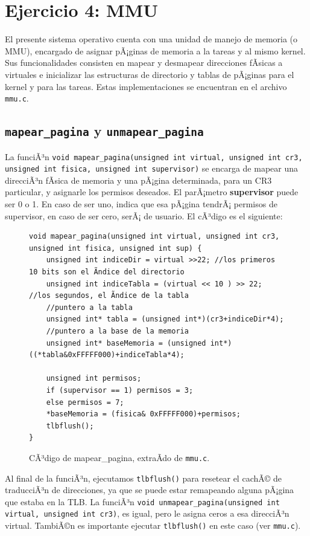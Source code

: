\documentclass[10pt, a4paper]{article}
\begin{document}
\section{Ejercicio 4: MMU}

El presente sistema operativo cuenta con una unidad de manejo de memoria (o MMU), encargado de asignar pÃ¡ginas de memoria a la tareas y al mismo kernel.
Sus funcionalidades consisten en mapear y desmapear direcciones fÃ­sicas a virtuales e inicializar las estructuras de directorio y tablas de pÃ¡ginas 
para el kernel y para las tareas.
Estas implementaciones se encuentran en el archivo \texttt{mmu.c}.
\subsection{\texttt{mapear\_pagina} y \texttt{unmapear\_pagina}}
La funciÃ³n \texttt{void mapear\_pagina(unsigned int virtual, unsigned int cr3, unsigned int fisica, unsigned int supervisor)} se encarga de mapear una direcciÃ³n fÃ­sica
de memoria y una pÃ¡gina determinada, para un CR3 particular, y asignarle los permisos deseados. 
El parÃ¡metro \textbf{supervisor} puede ser 0 o 1. En caso de ser uno, indica que esa pÃ¡gina tendrÃ¡ permisos de supervisor, en caso de ser cero, serÃ¡ de usuario.
El cÃ³digo es el siguiente:
\begin{figure}[!h]
\begin{center}
\begin{verbatim}
void mapear_pagina(unsigned int virtual, unsigned int cr3, unsigned int fisica, unsigned int sup) {
	unsigned int indiceDir = virtual >>22; //los primeros 10 bits son el Ã­ndice del directorio
	unsigned int indiceTabla = (virtual << 10 ) >> 22; //los segundos, el Ã­ndice de la tabla
	//puntero a la tabla
	unsigned int* tabla = (unsigned int*)(cr3+indiceDir*4);
	//puntero a la base de la memoria
	unsigned int* baseMemoria = (unsigned int*)((*tabla&0xFFFFF000)+indiceTabla*4);

	unsigned int permisos;
	if (supervisor == 1) permisos = 3;
	else permisos = 7; 
	*baseMemoria = (fisica& 0xFFFFF000)+permisos; 
	tlbflush();
}
\end{verbatim}
\caption{CÃ³digo de mapear\_pagina, extraÃ­do de \texttt{mmu.c}.}
\end{center}
\end{figure}
\newline
Al final de la funciÃ³n, ejecutamos \texttt{tlbflush()} para resetear el cachÃ© de traducciÃ³n de direcciones, ya que se puede estar remapeando alguna pÃ¡gina que estaba en la TLB.
La funciÃ³n \texttt{void unmapear\_pagina(unsigned int virtual, unsigned int cr3)}, es igual, pero le asigna ceros a esa direcciÃ³n virtual. TambiÃ©n es importante ejecutar
\texttt{tlbflush()} en este caso (ver \texttt{mmu.c}).
\end{document}
